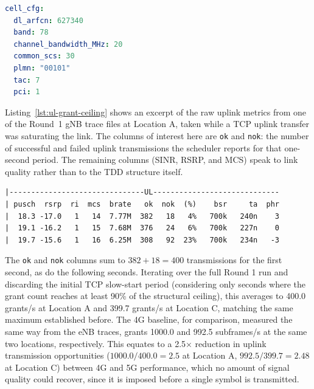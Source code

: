 \begin{lstlisting}[language=yaml,backgroundcolor=\color{gray!20},frame=single,framerule=0.8pt,rulecolor=\color{black},basicstyle=\ttfamily\small,caption={\texttt{gnb.yaml} \texttt{cell\_cfg} block used in Round 1.},label={lst:cell_cfg}]
cell_cfg:
  dl_arfcn: 627340
  band: 78
  channel_bandwidth_MHz: 20
  common_scs: 30
  plmn: "00101"
  tac: 7
  pci: 1
\end{lstlisting}

Listing~\ref{lst:ul-grant-ceiling} shows an excerpt of the raw uplink metrics from one of the Round~1 \gls{gNB} trace files at Location A, taken while a TCP uplink transfer was saturating the link. The columns of interest here are \texttt{ok} and \texttt{nok}: the number of successful and failed uplink transmissions the scheduler reports for that one-second period. The remaining columns (\gls{SINR}, \gls{RSRP}, and \gls{MCS}) speak to link quality rather than to the \gls{TDD} structure itself.

\begin{lstlisting}[backgroundcolor=\color{gray!20},frame=single,framerule=0.8pt,rulecolor=\color{black},basicstyle=\ttfamily\small,columns=fixed,keepspaces=true,caption={Console trace from the Location A (2\,m) TCP uplink test in Round~1.},label={lst:ul-grant-ceiling}]
|-------------------------------UL-----------------------------
| pusch  rsrp  ri  mcs  brate   ok  nok  (%)    bsr     ta  phr
|  18.3 -17.0   1   14  7.77M  382   18   4%   700k   240n    3
|  19.1 -16.2   1   15  7.68M  376   24   6%   700k   227n    0
|  19.7 -15.6   1   16  6.25M  308   92  23%   700k   234n   -3
\end{lstlisting}

The \texttt{ok} and \texttt{nok} columns sum to $382+18=400$ transmissions for the first second, as do the following seconds. Iterating over the full Round 1 run and discarding the initial TCP slow-start period (considering only seconds where the grant count reaches at least 90\% of the structural ceiling), this averages to 400.0 grants/s at Location A and 399.7 grants/s at Location C, matching the same maximum established before. The 4G baseline, for comparison, measured the same way from the \gls{eNB} traces, grants 1000.0 and 992.5 subframes/s at the same two locations, respectively. This equates to a 2.5$\times$ reduction in uplink transmission opportunities ($1000.0/400.0 = 2.5$ at Location A, $992.5/399.7 = 2.48$ at Location C) between 4G and 5G performance, which no amount of signal quality could recover, since it is imposed before a single symbol is transmitted.

